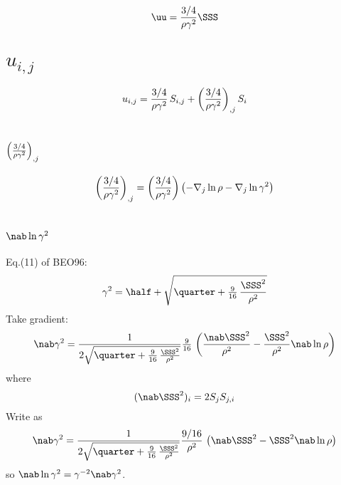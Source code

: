 \documentclass[twocolumn]{article}
\title{}
\author{}
\date{\today,~ $ $Revision: 1.95 $ $}
\begin{document}

\begin{equation}
\uu={3/4\over\rho\gamma^2}\SSS
\end{equation}

\section{$u_{i,j}$}

\begin{equation}
u_{i,j}={3/4\over\rho\gamma^2}\,S_{i,j}+\left({3/4\over\rho\gamma^2}\right)_{,j} S_i
\end{equation}

\section{$\left({3/4\over\rho\gamma^2}\right)_{,j}$}

\begin{equation}
\left({3/4\over\rho\gamma^2}\right)_{,j}
=\left({3/4\over\rho\gamma^2}\right) \left(-\nabla_j\ln\rho-\nabla_j\ln\gamma^2\right)
\end{equation}

\section{$\nab\ln\gamma^2$}

Eq.(11) of BEO96:
\begin{equation}
\gamma^2=\half+\sqrt{\quarter+{\textstyle{9\over16}}\,{\SSS^2\over\rho^2}}
\end{equation}
Take gradient:
\begin{equation}
\nab\gamma^2={1\over2\sqrt{\quarter+{\textstyle{9\over16}}\,{\SSS^2\over\rho^2}}}{\textstyle{9\over16}}\,
\left({\nab\SSS^2\over\rho^2}-{\SSS^2\over\rho^2}\nab\ln\rho\right)
\end{equation}
where
\begin{equation}
(\nab\SSS^2)_i=2S_j S_{j,i}
\end{equation}
Write as
\begin{equation}
\nab\gamma^2={1\over2\sqrt{\quarter+{\textstyle{9\over16}}\,{\SSS^2\over\rho^2}}}
{9/16\over\rho^2}\,
\left(\nab\SSS^2-\SSS^2\nab\ln\rho\right)
\end{equation}
so $\nab\ln\gamma^2=\gamma^{-2}\nab\gamma^2$.
\end{document}
